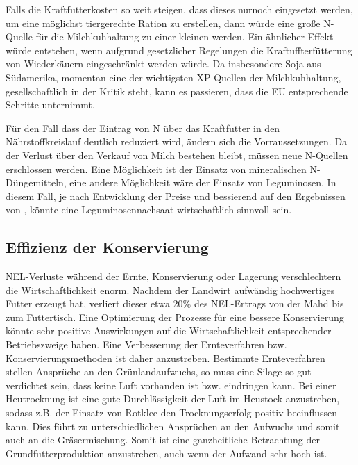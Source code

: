 Falls die Kraftfutterkosten so weit steigen, dass dieses nurnoch eingesetzt werden, um eine möglichst tiergerechte Ration zu erstellen, dann würde eine große N-Quelle für die Milchkuhhaltung zu einer kleinen werden.
Ein ähnlicher Effekt würde entstehen, wenn aufgrund gesetzlicher Regelungen die Kraftuffterfütterung von Wiederkäuern eingeschränkt werden würde.
Da insbesondere Soja aus Südamerika, momentan eine der wichtigsten \ac{XP}-Quellen  der Milchkuhhaltung, gesellschaftlich in der Kritik steht, kann es passieren, dass die \ac{EU} entsprechende Schritte unternimmt.

Für den Fall dass der Eintrag von N über das Kraftfutter in den Nährstoffkreislauf deutlich reduziert wird, ändern sich die Vorraussetzungen.
Da der Verlust über den Verkauf von Milch bestehen bleibt, müssen neue N-Quellen erschlossen werden.
Eine Möglichkeit ist der Einsatz von mineralischen N-Düngemitteln, eine andere Möglichkeit wäre der Einsatz von Leguminosen.
In diesem Fall, je nach Entwicklung der Preise und bessierend auf den Ergebnissen von \textcite[33-36]{weggler2050leguminosen}, könnte eine Leguminosennachsaat wirtschaftlich sinnvoll sein.


\subsection{Effizienz der Konservierung}
\label{sub:konservierung}
\ac{NEL}-Verluste während der Ernte, Konservierung oder Lagerung verschlechtern die Wirtschaftlichkeit enorm.
Nachdem der Landwirt aufwändig hochwertiges Futter erzeugt hat, verliert dieser etwa 20\% des \ac{NEL}-Ertrags von der Mahd bis zum Futtertisch.
Eine Optimierung der Prozesse für eine bessere Konservierung könnte sehr positive Auswirkungen auf die Wirtschaftlichkeit entsprechender Betriebszweige haben.
Eine Verbesserung der Ernteverfahren bzw. Konservierungsmethoden ist daher anzustreben.
Bestimmte Ernteverfahren stellen Ansprüche an den Grünlandaufwuchs, so muss eine Silage so gut verdichtet sein, dass keine Luft vorhanden ist bzw. eindringen kann.
Bei einer Heutrocknung ist eine gute Durchlässigkeit der Luft im Heustock anzustreben, sodass z.B. der Einsatz von Rotklee den Trocknungserfolg positiv beeinflussen kann.
Dies führt zu unterschiedlichen Ansprüchen an den Aufwuchs und somit auch an die Gräsermischung.
Somit ist eine ganzheitliche Betrachtung der Grundfutterproduktion anzustreben, auch wenn der Aufwand sehr hoch ist.

